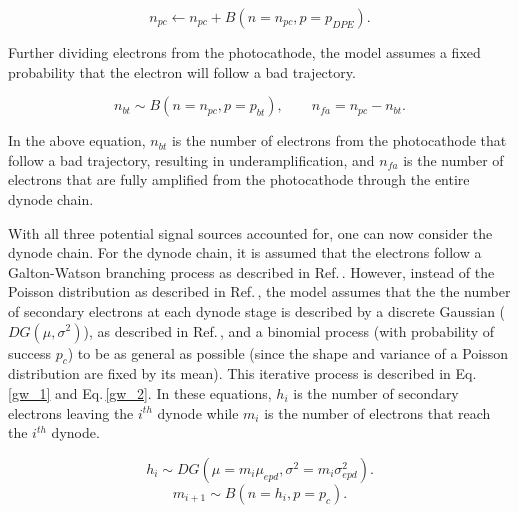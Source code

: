 \documentclass[11pt,a4paper]{article}
\newcommand\eqnref[1]{Eq.\,\ref{#1}}
\newcommand\citeref[1]{Ref.\,\cite{#1}}
\begin{document}
\begin{equation}
n_{pc} \leftarrow n_{pc} + B(n=n_{pc}, p=p_{DPE}).
\end{equation}

Further dividing electrons from the photocathode, the model assumes a fixed probability that the electron will follow a bad trajectory.


\begin{equation}
n_{bt} \sim B(n=n_{pc}, p=p_{bt}), \qquad
n_{fa} = n_{pc} - n_{bt}.
\end{equation}

In the above equation, $n_{bt}$ is the number of electrons from the photocathode that follow a bad trajectory, resulting in underamplification, and $n_{fa}$ is the number of electrons that are fully amplified from the photocathode through the entire dynode chain.


With all three potential signal sources accounted for, one can now consider the dynode chain.  For the dynode chain, it is assumed that the electrons follow a Galton-Watson branching process as described in \citeref{tan}.  However, instead of the Poisson distribution as described in \citeref{tan}, the model assumes that the the number of secondary electrons at each dynode stage is described by a discrete Gaussian ($DG(\mu,\sigma^2)$), as described in \citeref{dwarakanath}, and a binomial process (with probability of success $p_c$) to be as general as possible (since the shape and variance of a Poisson distribution are fixed by its mean).  This iterative process is described in \eqnref{gw_1} and \eqnref{gw_2}.  In these equations, $h_{i}$ is the number of secondary electrons leaving the $i^{th}$ dynode while $m_{i}$ is the number of electrons that reach the $i^{th}$ dynode.

\begin{equation}
\label{gw_1}
h_{i} \sim DG(\mu=m_{i} \mu_{epd}, \sigma^2 = m_{i} \sigma^2_{epd}).
\end{equation}
\begin{equation}
\label{gw_2}
m_{i+1} \sim B(n=h_{i}, p=p_{c}).
\end{equation}
\end{document}
